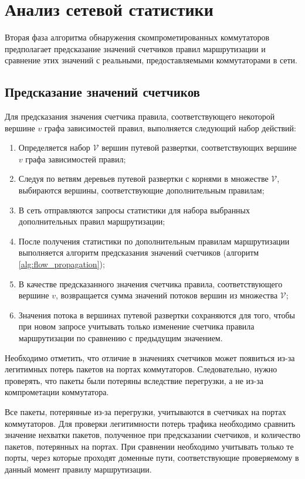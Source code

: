 \documentclass[../thesis.tex]{subfiles}
\begin{document}
\pagebreak

\section{Анализ сетевой статистики}

Вторая фаза алгоритма обнаружения скомпрометированных коммутаторов предполагает предсказание значений счетчиков правил маршрутизации и сравнение этих значений с реальными, предоставляемыми коммутаторами в сети.

\subsection{Предсказание значений счетчиков}

Для предсказания значения счетчика правила, соответствующего некоторой вершине $v$ графа зависимостей правил, выполняется следующий набор действий:
\begin{enumerate}
\item Определяется набор $\mathcal{V}$ вершин путевой развертки, соответствующих вершине $v$ графа зависимостей правил;
\item Следуя по ветвям деревьев путевой развертки с корнями в множестве $\mathcal{V}$, выбираются вершины, соответствующие дополнительным правилам;
\item В сеть отправляются запросы статистики для набора выбранных дополнительных правил маршрутизации;
\item После получения статистики по дополнительным правилам маршрутизации выполняется алгоритм предсказания значений счетчиков (алгоритм \ref{alg:flow_propagation});
\item В качестве предсказанного значения счетчика правила, соответствующего вершине $v$, возвращается сумма значений потоков вершин из множества $\mathcal{V}$;
\item Значения потока в вершинах путевой развертки сохраняются для того, чтобы при новом запросе учитывать только изменение счетчика правила маршрутизации по сравнению с предыдущим значением.
\end{enumerate}

Необходимо отметить, что отличие в значениях счетчиков может появиться из-за легитимных потерь пакетов на портах коммутаторов.
Следовательно, нужно проверять, что пакеты были потеряны вследствие перегрузки, а не из-за компрометации коммутатора.

Все пакеты, потерянные из-за перегрузки, учитываются в счетчиках на портах коммутаторов.
Для проверки легитимности потерь трафика необходимо сравнить значение нехватки пакетов, полученное при предсказании счетчиков, и количество пакетов, потерянных на портах.
При сравнении необходимо учитывать только те порты, через которые проходят доменные пути, соответствующие проверяемому в данный момент правилу маршрутизации.
\end{document}

